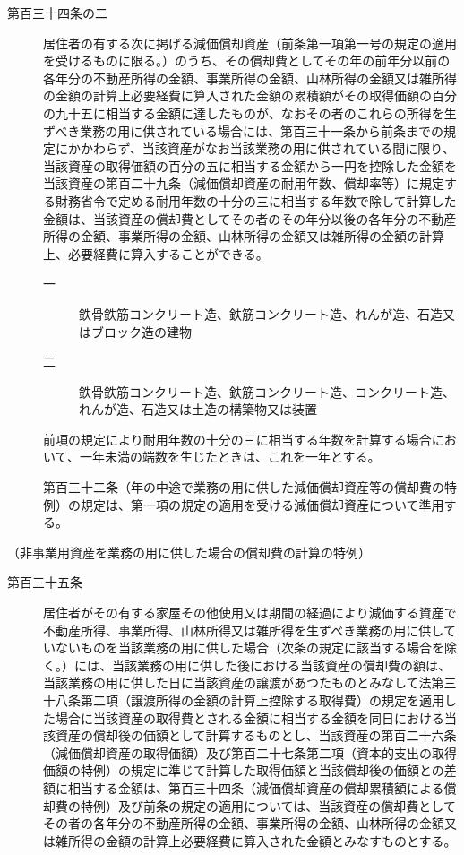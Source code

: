 \documentclass[twocolumn,a4j,10pt]{ltjtarticle}
\begin{document}
\begin{description}
\item[第百三十四条の二]居住者の有する次に掲げる減価償却資産（前条第一項第一号の規定の適用を受けるものに限る。）のうち、その償却費としてその年の前年分以前の各年分の不動産所得の金額、事業所得の金額、山林所得の金額又は雑所得の金額の計算上必要経費に算入された金額の累積額がその取得価額の百分の九十五に相当する金額に達したものが、なおその者のこれらの所得を生ずべき業務の用に供されている場合には、第百三十一条から前条までの規定にかかわらず、当該資産がなお当該業務の用に供されている間に限り、当該資産の取得価額の百分の五に相当する金額から一円を控除した金額を当該資産の第百二十九条（減価償却資産の耐用年数、償却率等）に規定する財務省令で定める耐用年数の十分の三に相当する年数で除して計算した金額は、当該資産の償却費としてその者のその年分以後の各年分の不動産所得の金額、事業所得の金額、山林所得の金額又は雑所得の金額の計算上、必要経費に算入することができる。
\begin{description}
\item[一]鉄骨鉄筋コンクリート造、鉄筋コンクリート造、れんが造、石造又はブロック造の建物
\item[二]鉄骨鉄筋コンクリート造、鉄筋コンクリート造、コンクリート造、れんが造、石造又は土造の構築物又は装置
\end{description}
\item[]前項の規定により耐用年数の十分の三に相当する年数を計算する場合において、一年未満の端数を生じたときは、これを一年とする。
\item[]第百三十二条（年の中途で業務の用に供した減価償却資産等の償却費の特例）の規定は、第一項の規定の適用を受ける減価償却資産について準用する。
\end{description}
\noindent\hspace{10pt}（非事業用資産を業務の用に供した場合の償却費の計算の特例）
\begin{description}
\item[第百三十五条]居住者がその有する家屋その他使用又は期間の経過により減価する資産で不動産所得、事業所得、山林所得又は雑所得を生ずべき業務の用に供していないものを当該業務の用に供した場合（次条の規定に該当する場合を除く。）には、当該業務の用に供した後における当該資産の償却費の額は、当該業務の用に供した日に当該資産の譲渡があつたものとみなして法第三十八条第二項（譲渡所得の金額の計算上控除する取得費）の規定を適用した場合に当該資産の取得費とされる金額に相当する金額を同日における当該資産の償却後の価額として計算するものとし、当該資産の第百二十六条（減価償却資産の取得価額）及び第百二十七条第二項（資本的支出の取得価額の特例）の規定に準じて計算した取得価額と当該償却後の価額との差額に相当する金額は、第百三十四条（減価償却資産の償却累積額による償却費の特例）及び前条の規定の適用については、当該資産の償却費としてその者の各年分の不動産所得の金額、事業所得の金額、山林所得の金額又は雑所得の金額の計算上必要経費に算入された金額とみなすものとする。
\end{description}
\end{document}
